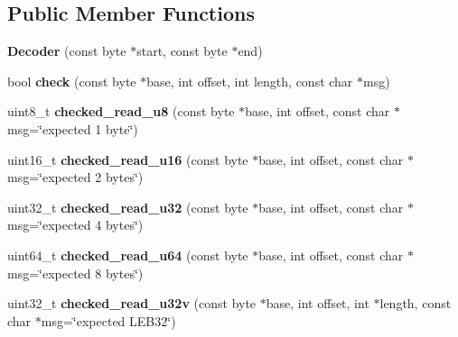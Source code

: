 \subsection*{Public Member Functions}
\begin{DoxyCompactItemize}
\item 
{\bfseries Decoder} (const byte $\ast$start, const byte $\ast$end)\hypertarget{classv8_1_1internal_1_1wasm_1_1_decoder_aed37fc13e742edf7d829c8eba099ce7b}{}\label{classv8_1_1internal_1_1wasm_1_1_decoder_aed37fc13e742edf7d829c8eba099ce7b}

\item 
bool {\bfseries check} (const byte $\ast$base, int offset, int length, const char $\ast$msg)\hypertarget{classv8_1_1internal_1_1wasm_1_1_decoder_a027ba786a9dc21f8c315873c3e19ec83}{}\label{classv8_1_1internal_1_1wasm_1_1_decoder_a027ba786a9dc21f8c315873c3e19ec83}

\item 
uint8\+\_\+t {\bfseries checked\+\_\+read\+\_\+u8} (const byte $\ast$base, int offset, const char $\ast$msg=\char`\"{}expected 1 byte\char`\"{})\hypertarget{classv8_1_1internal_1_1wasm_1_1_decoder_ac93d9e4957b721071c6ba83fa34aecaa}{}\label{classv8_1_1internal_1_1wasm_1_1_decoder_ac93d9e4957b721071c6ba83fa34aecaa}

\item 
uint16\+\_\+t {\bfseries checked\+\_\+read\+\_\+u16} (const byte $\ast$base, int offset, const char $\ast$msg=\char`\"{}expected 2 bytes\char`\"{})\hypertarget{classv8_1_1internal_1_1wasm_1_1_decoder_aae61392691730c8e66bd2294c77ddcc9}{}\label{classv8_1_1internal_1_1wasm_1_1_decoder_aae61392691730c8e66bd2294c77ddcc9}

\item 
uint32\+\_\+t {\bfseries checked\+\_\+read\+\_\+u32} (const byte $\ast$base, int offset, const char $\ast$msg=\char`\"{}expected 4 bytes\char`\"{})\hypertarget{classv8_1_1internal_1_1wasm_1_1_decoder_a3b1c769d8d0a1468c8cd0ed9df77402c}{}\label{classv8_1_1internal_1_1wasm_1_1_decoder_a3b1c769d8d0a1468c8cd0ed9df77402c}

\item 
uint64\+\_\+t {\bfseries checked\+\_\+read\+\_\+u64} (const byte $\ast$base, int offset, const char $\ast$msg=\char`\"{}expected 8 bytes\char`\"{})\hypertarget{classv8_1_1internal_1_1wasm_1_1_decoder_a5d91cb56b0db7e666e4a6761787f0ff5}{}\label{classv8_1_1internal_1_1wasm_1_1_decoder_a5d91cb56b0db7e666e4a6761787f0ff5}

\item 
uint32\+\_\+t {\bfseries checked\+\_\+read\+\_\+u32v} (const byte $\ast$base, int offset, int $\ast$length, const char $\ast$msg=\char`\"{}expected L\+E\+B32\char`\"{})\hypertarget{classv8_1_1internal_1_1wasm_1_1_decoder_ad9424fc0c16b29c66d62aace8d1c756b}{}\label{classv8_1_1internal_1_1wasm_1_1_decoder_ad9424fc0c16b29c66d62aace8d1c756b}


\end{DoxyCompactItemize}
